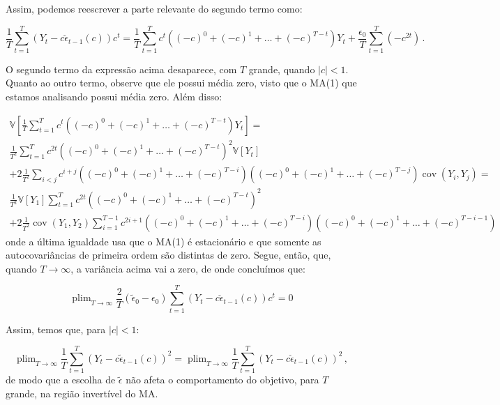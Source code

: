 \documentclass[10pt,a4paper]{article}
\begin{document}
Assim, podemos reescrever a parte relevante do segundo termo como:


$$	\frac{1}{T}\sum_{t=1}^T(Y_t - c \check{\epsilon}_{t-1}(c))c^t  =  \frac{1}{T}\sum_{t=1}^T c^{t}((-c)^{0} + (-c)^{1} + \ldots + (-c)^{T-t})Y_t +\frac{\epsilon_0}{T}\sum_{t=1}^T (-c^{2t})\, .$$

O segundo termo da expressão acima desaparece, com $T$ grande, quando $|c|<1$. Quanto ao outro termo, observe que ele possui média zero, visto que o MA(1) que estamos analisando possui média zero. Além disso:

\begin{equation}
	\begin{aligned}
		\mathbb{V}\left[ \frac{1}{T}\sum_{t=1}^T c^{t}((-c)^{0} + (-c)^{1} + \ldots + (-c)^{T-t})Y_t\right] = \\ \frac{1}{T^2} \sum_{t=1}^T c^{2t}((-c)^{0} + (-c)^{1} + \ldots +  (-c)^{T-t})^2 \mathbb{V}[Y_t] \\ + 2 \frac{1}{T^2}\sum_{i< j}c^{i+j} ((-c)^{0} + (-c)^{1} + \ldots +  (-c)^{T-i})((-c)^{0} + (-c)^{1} + \ldots +  (-c)^{T-j})\operatorname{cov}(Y_i,Y_j) = \\
		\frac{1}{T^2}  \mathbb{V}[Y_1] \sum_{t=1}^T c^{2t}((-c)^{0} + (-c)^{1} + \ldots +  (-c)^{T-t})^2 \\ + 2 \frac{1}{T^2}\operatorname{cov}(Y_1,Y_2) \sum_{i= 1}^{T-1}c^{2i+1} ((-c)^{0} + (-c)^{1} + \ldots +  (-c)^{T-i})((-c)^{0} + (-c)^{1} + \ldots +  (-c)^{T-i-1})
	\end{aligned}
\end{equation}
onde a última igualdade usa que o MA(1) é estacionário e que somente as autocovariâncias de primeira ordem são distintas de zero. Segue, então, que, quando	$T \to \infty$, a variância acima vai a zero, de onde concluímos que: 

$$\operatorname{plim}_{T\to \infty} \frac{2}{T}(\tilde{\epsilon}_0 - \epsilon_0)\sum_{t=1}^T(Y_t - c \check{\epsilon}_{t-1}(c))c^t = 0$$

Assim, temos que, para $|c| < 1$:

$$	\operatorname{plim}_{T\to \infty}\frac{1}{T}\sum_{t=1}^T (Y_t - c \tilde \epsilon_{t-1}(c))^2 =\operatorname{plim}_{T\to \infty} \frac{1}{T}\sum_{t=1}^T (Y_t - c \check \epsilon_{t-1}(c))^2\,,$$
de modo que a escolha de $\tilde{\epsilon}$ não afeta o comportamento do objetivo, para $T$ grande, na região invertível do MA.
\end{document}
